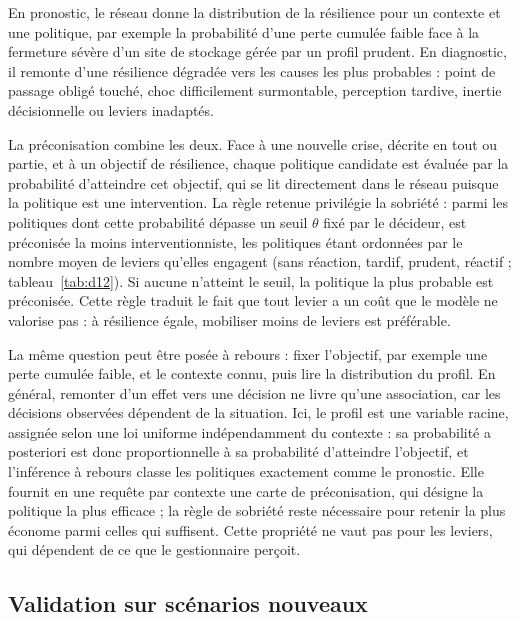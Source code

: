 En pronostic, le réseau donne la distribution de la résilience pour un contexte et une politique, par exemple la probabilité d'une perte cumulée faible face à la fermeture sévère d'un site de stockage gérée par un profil prudent. En diagnostic, il remonte d'une résilience dégradée vers les causes les plus probables : point de passage obligé touché, choc difficilement surmontable, perception tardive, inertie décisionnelle ou leviers inadaptés.

La préconisation combine les deux. Face à une nouvelle crise, décrite en tout ou partie, et à un objectif de résilience, chaque politique candidate est évaluée par la probabilité d'atteindre cet objectif, qui se lit directement dans le réseau puisque la politique est une intervention. La règle retenue privilégie la sobriété : parmi les politiques dont cette probabilité dépasse un seuil $\theta$ fixé par le décideur, est préconisée la moins interventionniste, les politiques étant ordonnées par le nombre moyen de leviers qu'elles engagent (sans réaction, tardif, prudent, réactif ; tableau~\ref{tab:d12}). Si aucune n'atteint le seuil, la politique la plus probable est préconisée. Cette règle traduit le fait que tout levier a un coût que le modèle ne valorise pas : à résilience égale, mobiliser moins de leviers est préférable.

La même question peut être posée à rebours : fixer l'objectif, par exemple une perte cumulée faible, et le contexte connu, puis lire la distribution du profil. En général, remonter d'un effet vers une décision ne livre qu'une association, car les décisions observées dépendent de la situation. Ici, le profil est une variable racine, assignée selon une loi uniforme indépendamment du contexte : sa probabilité a posteriori est donc proportionnelle à sa probabilité d'atteindre l'objectif, et l'inférence à rebours classe les politiques exactement comme le pronostic. Elle fournit en une requête par contexte une carte de préconisation, qui désigne la politique la plus efficace ; la règle de sobriété reste nécessaire pour retenir la plus économe parmi celles qui suffisent. Cette propriété ne vaut pas pour les leviers, qui dépendent de ce que le gestionnaire perçoit.

\subsection{Validation sur scénarios nouveaux}
\label{sec:5.4}

